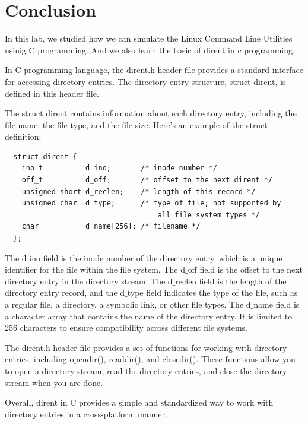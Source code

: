 \documentclass[journal,onecolumn]{IEEEtran}
\begin{document}
\section{Conclusion}
In this lab, we studied how we can simulate the Linux Command Line Utilities usinig C programming. And we also learn the basic of dirent in c programming.

In C programming language, the dirent.h header file provides a standard interface for accessing directory entries. The directory entry structure, struct dirent, is defined in this header file.

The struct dirent contains information about each directory entry, including the file name, the file type, and the file size. Here's an example of the struct definition:

\begin{verbatim}
  struct dirent {
    ino_t          d_ino;       /* inode number */
    off_t          d_off;       /* offset to the next dirent */
    unsigned short d_reclen;    /* length of this record */
    unsigned char  d_type;      /* type of file; not supported by 
                                    all file system types */
    char           d_name[256]; /* filename */
  };
\end{verbatim}

The d$\_$ino field is the inode number of the directory entry, which is a unique identifier for the file within the file system. The d$\_$off field is the offset to the next directory entry in the directory stream. The d$\_$reclen field is the length of the directory entry record, and the d$\_$type field indicates the type of the file, such as a regular file, a directory, a symbolic link, or other file types. The d$\_$name field is a character array that contains the name of the directory entry. It is limited to 256 characters to ensure compatibility across different file systems.

The dirent.h header file provides a set of functions for working with directory entries, including opendir(), readdir(), and closedir(). These functions allow you to open a directory stream, read the directory entries, and close the directory stream when you are done.

Overall, dirent in C provides a simple and standardized way to work with directory entries in a cross-platform manner.
\end{document}
